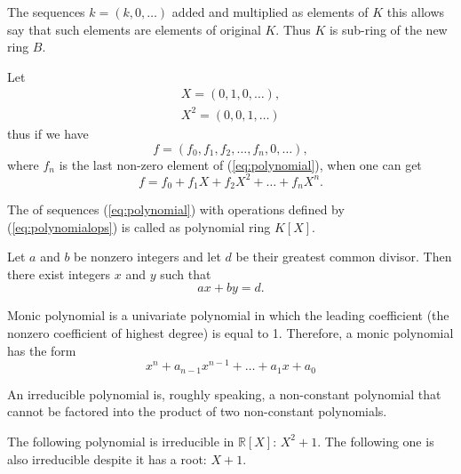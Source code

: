 \begin{appendices}
The
sequences $k = \left(k, 0, \dots \right)$ added and multiplied as
elements of $K$ this allows say that such elements are elements of
original  $K$. Thus $K$ is sub-ring of the new ring
$B$.

Let
\begin{eqnarray}
  X = \left(0, 1, 0, \dots \right),
  \nonumber \\
  X^2 = \left(0, 0, 1, \dots \right)
  \nonumber
\end{eqnarray}
thus if we have
\[
f = \left(f_0, f_1, f_2, \dots, f_n, 0, \dots \right),
\]
where $f_n$ is the last non-zero element of (\ref{eq:polynomial}),
when one can get
\[
f = f_0 + f_1 X + f_2 X^2 + \dots + f_n X^n.
\]

\begin{definition}
  The  of sequences (\ref{eq:polynomial}) with
  operations defined by (\ref{eq:polynomialops}) is called as
  polynomial ring $K\left[X\right]$.
  \label{def:polynomial}
\end{definition}

\begin{lemma}
  Let $a$ and $b$ be nonzero integers and let $d$ be their greatest common
  divisor. Then there exist integers $x$ and $y$ such that 
  \[
  a x + by = d.
  \]
  \label{lem:bezout}
\end{lemma}

\begin{definition}
  Monic polynomial is a univariate polynomial in which the leading
  coefficient (the nonzero coefficient of highest degree) is equal to
  1. Therefore, a monic polynomial has the form
  \[
  x^n + a_{n-1}x^{n-1}+ \dots + a_1 x + a_0
  \]
  \label{def:monicpolynomial}
\end{definition}

\begin{definition}
  An irreducible polynomial is, roughly speaking, a non-constant
  polynomial that cannot be factored into the product of two
  non-constant polynomials.
  \label{def:irreducible}
\end{definition}

\begin{example}
  The following polynomial is irreducible in
  $\mathbb{R}\left[X\right]$: $X^2 + 1$. The following one is also
  irreducible despite it has a root: $X+1$.
  \label{ex:irreducible}
\end{example}


\end{appendices}
